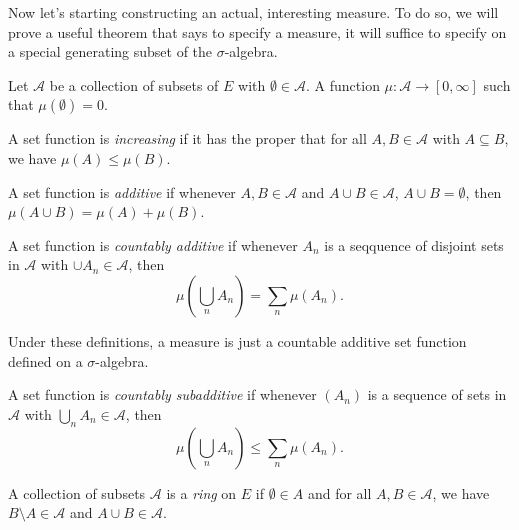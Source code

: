 \documentclass[a4paper]{article}
\begin{document}
Now let's starting constructing an actual, interesting measure. To do so, we will prove a useful theorem that says to specify a measure, it will suffice to specify on a special generating subset of the $\sigma$-algebra.

\begin{defi}
  Let $\mathcal{A}$ be a collection of subsets of $E$ with $\emptyset \in \mathcal{A}$. A  function $\mu: \mathcal{A} \to [0, \infty]$ such that $\mu(\emptyset) = 0$.
\end{defi}

\begin{defi}
  A set function is \emph{increasing} if it has the proper that for all $A, B \in \mathcal{A}$ with $A \subseteq B$, we have $\mu(A) \leq \mu(B)$.
\end{defi}
\begin{defi}
  A set function is \emph{additive} if whenever $A, B \in \mathcal{A}$ and $A \cup B \in \mathcal{A}$, $A \cup B = \emptyset$, then $\mu(A \cup B) = \mu(A) + \mu(B)$.
\end{defi}

\begin{defi}
  A set function is \emph{countably additive} if whenever $A_n$ is a seqquence of disjoint sets in $\mathcal{A}$ with $\cup A_n \in \mathcal{A}$, then
  \[
    \mu\left(\bigcup_n A_n \right) = \sum_n \mu(A_n).
  \]
\end{defi}

Under these definitions, a measure is just a countable additive set function defined on a $\sigma$-algebra.

\begin{defi}
  A set function is \emph{countably subadditive} if whenever $(A_n)$ is a sequence of sets in $\mathcal{A}$ with $\bigcup_n A_n \in \mathcal{A}$, then
  \[
    \mu\left(\bigcup_n A_n\right) \leq \sum_n \mu(A_n).
  \]
\end{defi}

\begin{defi}[Ring]
  A collection of subsets $\mathcal{A}$ is a \emph{ring} on $E$ if $\emptyset \in A$ and for all $A, B \in \mathcal{A}$, we have $B \setminus A \in \mathcal{A}$ and $A \cup B \in \mathcal{A}$.
\end{defi}
\end{document}
